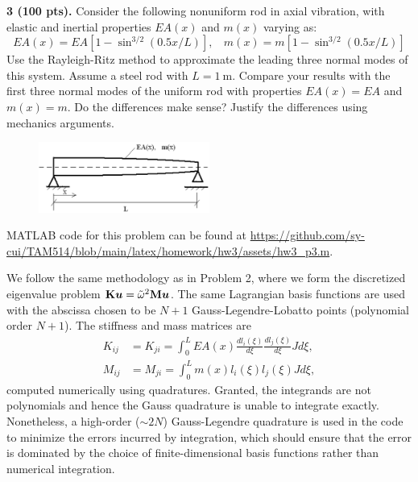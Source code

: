 \newpage
\begin{problem}
    \textbf{3 (100 pts).} Consider the following nonuniform rod in axial vibration, with elastic and inertial properties $EA(x)$ and $m(x)$ varying as:
    \begin{equation}
        EA(x) = EA\left[1 - \sin^{3/2}(0.5x/L) \right], ~~~~ m(x) = m\left[1 - \sin^{3/2}(0.5x/L) \right]
    \end{equation}
    Use the Rayleigh-Ritz method to approximate the leading three normal modes of this system.
    Assume a steel rod with $L=\qty{1}{\m}$. 
    Compare your results with the first three normal modes of the uniform rod with properties $EA(x) = EA$ and $m(x) = m$. 
    Do the differences make sense? 
    Justify the differences using mechanics arguments.  
\end{problem}
\begin{figure}[!ht]
    \centering
    \includegraphics[width=0.5\textwidth]{homework/hw3/assets/hw3_p3.png}
\end{figure}

MATLAB code for this problem can be found at \url{https://github.com/sy-cui/TAM514/blob/main/latex/homework/hw3/assets/hw3_p3.m}.

We follow the same methodology as in Problem 2, where we form the discretized eigenvalue problem $\mathbf{K} \bm{u} = \tilde{\omega}^2 \mathbf{M} \bm{u}$. 
The same Lagrangian basis functions are used with the abscissa chosen to be $N + 1$ Gauss-Legendre-Lobatto points (polynomial order $N + 1$). 
The stiffness and mass matrices are 
\begin{equation}
\begin{aligned}
    K_{ij} &= K_{ji} = \int_0^L EA(x) \frac{dl_i(\xi)}{d\xi} \frac{dl_j(\xi)}{d\xi} J d\xi, \\
    M_{ij} &= M_{ji} = \int_0^L m(x) l_i(\xi) l_j(\xi) J d\xi,
\end{aligned}
\end{equation}
computed numerically using quadratures. 
Granted, the integrands are not polynomials and hence the Gauss quadrature is unable to integrate exactly. 
Nonetheless, a high-order ($\sim 2N$) Gauss-Legendre quadrature is used in the code to minimize the errors incurred by integration, which should ensure that the error is dominated by the choice of finite-dimensional basis functions rather than numerical integration. 

